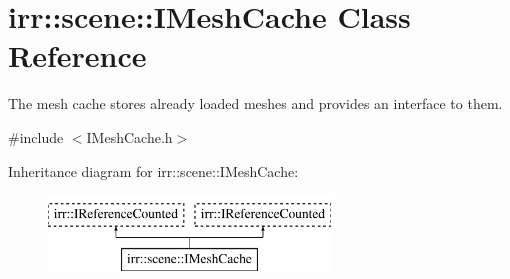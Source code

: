 \hypertarget{classirr_1_1scene_1_1IMeshCache}{}\section{irr\+:\+:scene\+:\+:I\+Mesh\+Cache Class Reference}
\label{classirr_1_1scene_1_1IMeshCache}


The mesh cache stores already loaded meshes and provides an interface to them.  




{\ttfamily \#include $<$I\+Mesh\+Cache.\+h$>$}

Inheritance diagram for irr\+:\+:scene\+:\+:I\+Mesh\+Cache\+:\begin{figure}[H]
\begin{center}
\leavevmode
\includegraphics[height=2.000000cm]{classirr_1_1scene_1_1IMeshCache}
\end{center}
\end{figure}
